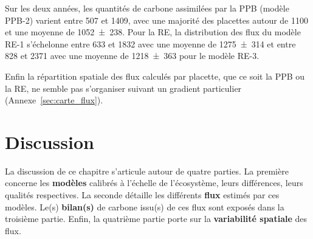 Sur les deux années, les quantités de carbone assimilées par la PPB (modèle PPB-2) varient entre 507 et \SI{1409}{\gcma}, avec une majorité des placettes autour de \SI{1100}{\gcma} et une moyenne de \SI{1052(238)}{\gcma}.
Pour la RE, la distribution des flux du modèle RE-1 s'échelonne entre 633 et \SI{1832}{\gcma} avec une moyenne de \SI{1275(314)}{\gcma} et entre 828 et \SI{2371}{\gcma} avec une moyenne de \SI{1218(363)}{\gcma} pour le modèle RE-3.

Enfin la répartition spatiale des flux calculés par placette, que ce soit la PPB ou la RE, ne semble pas s'organiser suivant un gradient particulier (Annexe~\ref{sec:carte_flux}).








\section{Discussion}

La discussion de ce chapitre s'articule autour de quatre parties.
La première concerne les \textbf{modèles} calibrés à l'échelle de l'écosystème, leurs différences, leurs qualités respectives.
La seconde détaille les différents \textbf{flux} estimés par ces modèles.
Le(s) \textbf{bilan(s)} de carbone issu(s) de ces flux sont exposés dans la troisième partie.
Enfin, la quatrième partie porte sur la \textbf{variabilité spatiale} des flux.

